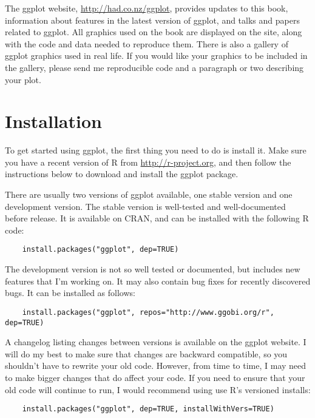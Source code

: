 The ggplot website, \url{http://had.co.nz/ggplot}, provides updates to this book, information about features in the latest version of ggplot, and talks and papers related to ggplot.  All graphics used on the book are displayed on the site, along with the code and data needed to reproduce them.  There is also a gallery of ggplot graphics used in real life.  If you would like your graphics to be included in the gallery, please send me reproducible code and a paragraph or two describing your plot.

\section{Installation}\label{sub:installation}

To get started using ggplot, the first thing you need to do is install it.  Make sure you have a recent version of R from \url{http://r-project.org}, and then follow the instructions below to download and install the ggplot package.  

There are usually two versions of ggplot available, one stable version and one development version. The stable version is well-tested and well-documented before release.  It is available on CRAN, and can be installed with the following R code:

\begin{verbatim}
	install.packages("ggplot", dep=TRUE)
\end{verbatim}

The development version is not so well tested or documented, but includes new features that I'm working on.  It may also contain bug fixes for recently discovered bugs.  It can be installed as follows:

\begin{verbatim}
	install.packages("ggplot", repos="http://www.ggobi.org/r", dep=TRUE)
\end{verbatim}

A changelog listing changes between versions is available on the ggplot website.  I will do my best to make sure that changes are backward compatible, so you shouldn't have to rewrite your old code.  However, from time to time, I may need to make bigger changes that do affect your code.  If you need to ensure that your old code will continue to run, I would recommend using use R's versioned installs:

\begin{verbatim}
	install.packages("ggplot", dep=TRUE, installWithVers=TRUE)
\end{verbatim}

